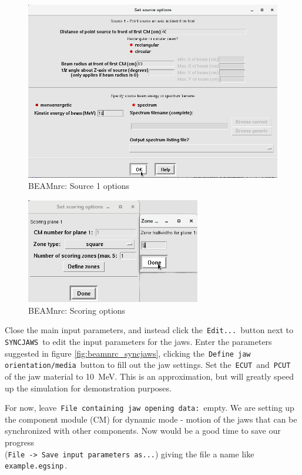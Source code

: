 \documentclass[12pt,twoside]{article}
\begin{document}
\begin{figure}
\begin{center}
\includegraphics[width=5in]{figures/beamnrc_source1}
\caption{BEAMnrc: Source 1 options}
\label{fig:beamnrc_source1}
\end{center}
\end{figure}

\begin{figure}
\begin{center}
\includegraphics[width=3in]{figures/beamnrc_scoring}
\caption{BEAMnrc: Scoring options}
\label{fig:beamnrc_scoring}
\end{center}
\end{figure}

Close the main input parameters, and instead click the \,\Verb|Edit...|\, button next to \,\Verb|SYNCJAWS|\, to edit the input parameters for the jaws. Enter the parameters suggested in figure \ref{fig:beamnrc_syncjaws}, clicking the \,\Verb|Define jaw orientation/media|\, button to fill out the jaw settings. Set the \,\Verb|ECUT|\, and \,\Verb|PCUT|\, of the jaw material to 10~MeV. This is an approximation, but will greatly speed up the simulation for demonstration purposes.

For now, leave \,\Verb|File containing jaw opening data:|\, empty. We are setting up the component module (CM) for dynamic mode - motion of the jaws that can be synchronized with other components. Now would be a good time to save our progress \\
(\Verb|File -> Save input parameters as...|) giving the file a name like
\,\Verb|example.egsinp|\,.
\end{document}
